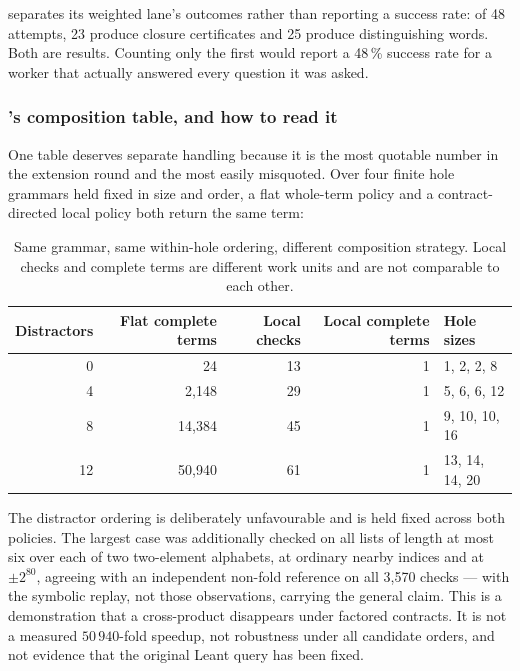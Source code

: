  separates its weighted lane's outcomes rather than reporting a success
rate: of 48 attempts, 23 produce closure certificates and 25 produce
distinguishing words. Both are results. Counting only the first would report a
48\,\% success rate for a worker that actually answered every question it was
asked.

\subsubsection*{'s composition table, and how to read it}

One table deserves separate handling because it is the most quotable number in
the extension round and the most easily misquoted. Over four finite hole
grammars held fixed in size and order, a flat whole-term policy and a
contract-directed local policy both return the same term:

\begin{table}[htbp]
\centering\small
\begin{tabular}{@{}rrrrl@{}}
\toprule
Distractors & Flat complete terms & Local checks & Local complete terms & Hole sizes \\
\midrule
0  & 24     & 13 & 1 & 1, 2, 2, 8 \\
4  & 2{,}148  & 29 & 1 & 5, 6, 6, 12 \\
8  & 14{,}384 & 45 & 1 & 9, 10, 10, 16 \\
12 & 50{,}940 & 61 & 1 & 13, 14, 14, 20 \\
\bottomrule
\end{tabular}
\caption{Same grammar, same within-hole ordering, different composition
strategy. Local checks and complete terms are different work units and are not
comparable to each other.}
\label{tab:composition}
\end{table}

The distractor ordering is deliberately unfavourable and is held fixed across
both policies. The largest case was additionally checked on all lists of length
at most six over each of two two-element alphabets, at ordinary nearby indices
and at $\pm2^{80}$, agreeing with an independent non-fold reference on all
3{,}570 checks --- with the symbolic replay, not those observations, carrying
the general claim. This is a demonstration that a cross-product disappears under
factored contracts. It is not a measured $50\,940$-fold speedup, not robustness
under all candidate orders, and not evidence that the original Leant query has
been fixed.

